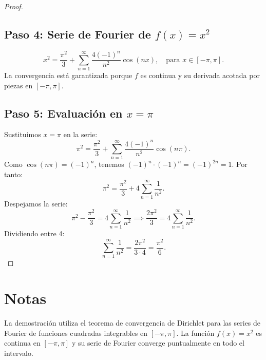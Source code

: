 \documentclass[11pt,a4paper]{article}
\theoremstyle{plain}
\theoremstyle{definition}
\begin{document}
\begin{proof}
\subsection*{Paso 4: Serie de Fourier de $f(x) = x^2$}
\[
x^2 = \frac{\pi^2}{3} + \sum_{n=1}^{\infty} \frac{4(-1)^n}{n^2} \cos(nx), \quad \text{para } x \in [-\pi, \pi].
\]
La convergencia est\'a garantizada porque $f$ es continua y su derivada acotada por piezas en $[-\pi, \pi]$.

\subsection*{Paso 5: Evaluaci\'on en $x = \pi$}
Sustituimos $x = \pi$ en la serie:
\[
\pi^2 = \frac{\pi^2}{3} + \sum_{n=1}^{\infty} \frac{4(-1)^n}{n^2} \cos(n\pi).
\]
Como $\cos(n\pi) = (-1)^n$, tenemos $(-1)^n \cdot (-1)^n = (-1)^{2n} = 1$. Por tanto:
\[
\pi^2 = \frac{\pi^2}{3} + 4 \sum_{n=1}^{\infty} \frac{1}{n^2}.
\]
Despejamos la serie:
\[
\pi^2 - \frac{\pi^2}{3} = 4 \sum_{n=1}^{\infty} \frac{1}{n^2} \implies \frac{2\pi^2}{3} = 4 \sum_{n=1}^{\infty} \frac{1}{n^2}.
\]
Dividiendo entre 4:
\[
\sum_{n=1}^{\infty} \frac{1}{n^2} = \frac{2\pi^2}{3 \cdot 4} = \frac{\pi^2}{6}.
\]
\end{proof}

\section{Notas}
La demostraci\'on utiliza el teorema de convergencia de Dirichlet para las series de Fourier de funciones cuadradas integrables en $[-\pi, \pi]$. La funci\'on $f(x) = x^2$ es continua en $[-\pi, \pi]$ y su serie de Fourier converge puntualmente en todo el intervalo.
\end{document}
